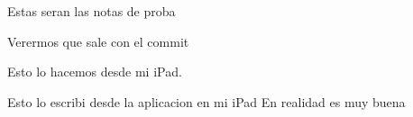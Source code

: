 \documentclass[12pt]{report}
\begin{document}
Estas seran las notas de proba

Verermos que sale con el commit

Esto lo hacemos desde mi iPad. 

Esto lo escribi desde la aplicacion en mi iPad En realidad es muy buena
\end{document}
